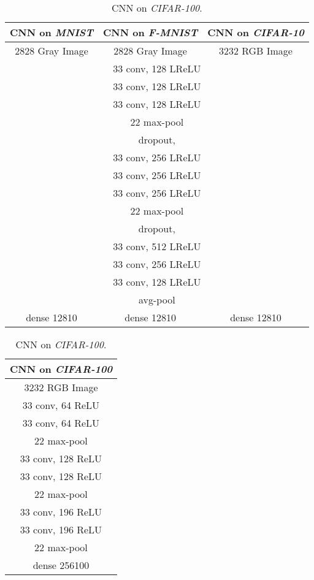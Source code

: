 \documentclass[11pt]{article}
\begin{document}
\begin{table}[!h]
    \begin{minipage}{0.55\linewidth}
	\centering
	\caption{CNN on \textit{MNIST}, \textit{F-MNIST}, and \textit{CIFAR-10}.}
	\label{tab:9layercnn}
	\scalebox{0.84}
	{
		\begin{tabular}{c | c | c }
			\hline
			CNN on \textit{MNIST} & CNN on \textit{F-MNIST} & CNN on \textit{CIFAR-10} \\ \hline
			2828 Gray Image & 2828 Gray Image  & 3232 RGB Image  \\ \hline
			\multicolumn{3}{c}{33 conv, 128 LReLU }   \\
			\multicolumn{3}{c}{33 conv, 128 LReLU }   \\
			\multicolumn{3}{c}{33 conv, 128 LReLU }   \\ \hline
			\multicolumn{3}{c}{22 max-pool} \\
			\multicolumn{3}{c}{dropout, } \\ \hline
			\multicolumn{3}{c}{33 conv, 256 LReLU }  \\
			\multicolumn{3}{c}{33 conv, 256 LReLU }   \\
			\multicolumn{3}{c}{33 conv, 256 LReLU }  \\ \hline
			\multicolumn{3}{c}{22 max-pool} \\
			\multicolumn{3}{c}{dropout, } \\ \hline
			\multicolumn{3}{c}{33 conv, 512 LReLU } \\
			\multicolumn{3}{c}{33 conv, 256 LReLU } \\
			\multicolumn{3}{c}{33 conv, 128 LReLU }  \\ \hline
			\multicolumn{3}{c}{avg-pool} \\ \hline
            dense 12810 & dense 12810 & dense 12810 \\ \hline
		\end{tabular}
	}
	\end{minipage}
	\begin{minipage}{0.55\linewidth}
	\centering
	\caption{CNN on \textit{CIFAR-100}.}
	\label{tab:7layercnn}
	\scalebox{0.84}
	{
		\begin{tabular}{c}
			\hline
			CNN on \textit{CIFAR-100} \\ \hline
			3232 RGB Image  \\ \hline
			33 conv, 64 ReLU    \\
			33 conv, 64 ReLU    \\
			\hline
			22 max-pool\\
			\hline
			33 conv, 128 ReLU   \\
			33 conv, 128 ReLU    \\
		    \hline
			22 max-pool\\
			\hline
			33 conv, 196 ReLU  \\
			33 conv, 196 ReLU  \\
			\hline
			22 max-pool \\ \hline
            dense 256100 \\ \hline
		\end{tabular}
	}
	\end{minipage}
\end{table}


\newpage


\end{document}
